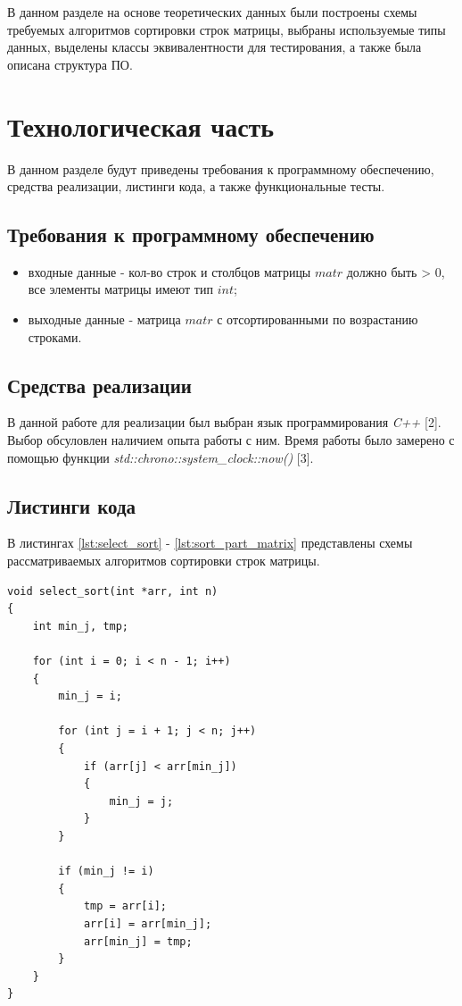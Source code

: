 \documentclass[a4paper,14pt, unknownkeysallowed]{extreport}
\begin{document}
В данном разделе на основе теоретических данных были построены схемы требуемых алгоритмов сортировки строк матрицы, выбраны используемые типы данных, выделены классы эквивалентности для тестирования, а также была описана структура ПО.

\clearpage





\chapter{Технологическая часть}

В данном разделе будут приведены требования к программному обеспечению, средства реализации, листинги кода, а также функциональные тесты.

\section{Требования к программному обеспечению}

\begin{itemize}
    \item входные данные - кол-во строк и столбцов матрицы $matr$ должно быть > 0, все элементы матрицы имеют тип $int$;
    \item выходные данные - матрица $matr$ с отсортированными по возрастанию строками.
\end{itemize}

\section{Средства реализации}

В данной работе для реализации был выбран язык программирования \textit{C++} [2]. Выбор обсуловлен наличием опыта работы с ним. Время работы было замерено с помощью функции \textit{std::chrono::system\_clock::now()} [3].

\clearpage

\section{Листинги кода}

В листингах \ref{lst:select_sort} - \ref{lst:sort_part_matrix} представлены схемы рассматриваемых алгоритмов сортировки строк матрицы.

\begin{center}
\captionsetup{justification=raggedright,singlelinecheck=off}
\begin{lstlisting}[label=lst:select_sort,caption=Функция алгоритма сортировки массива вставками по возрастанию]
void select_sort(int *arr, int n)
{
	int min_j, tmp;
	
	for (int i = 0; i < n - 1; i++)
	{
		min_j = i;

		for (int j = i + 1; j < n; j++)
		{
			if (arr[j] < arr[min_j])
			{
				min_j = j;
			}
		}

		if (min_j != i)
		{
			tmp = arr[i];
			arr[i] = arr[min_j];
			arr[min_j] = tmp;
		}
	}
}
\end{lstlisting}
\end{center}
\end{document}
